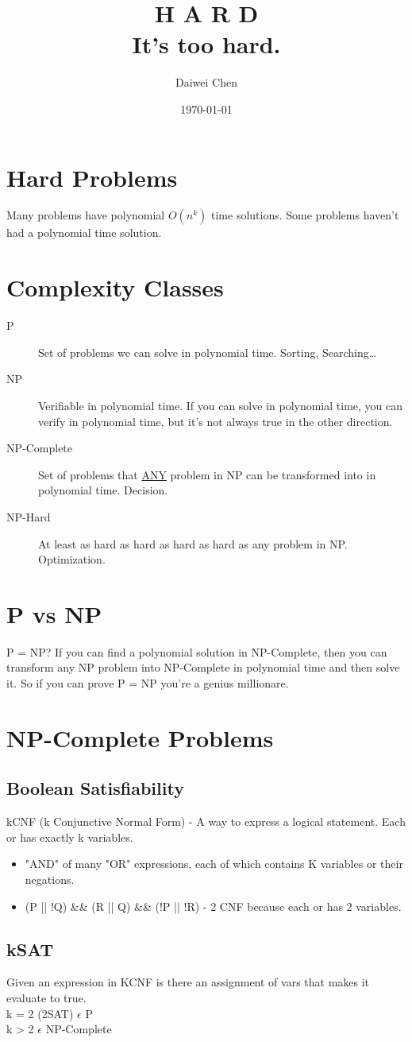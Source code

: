 \documentclass{article}
\author{Daiwei Chen}
\date{\today}
\title{\textbf{H A R D}\\\medskip
\large It's too hard.}
\begin{document}
\maketitle
\tableofcontents


\section{Hard Problems}
\label{sec:orgbdc091a}
Many problems have polynomial \(O(n^k)\) time solutions.
Some problems haven't had a polynomial time solution.

\section{Complexity Classes}
\label{sec:org485cc46}
\begin{description}
\item[{P}] Set of problems we can solve in polynomial time. Sorting, Searching\ldots{}
\item[{NP}] Verifiable in polynomial time. If you can solve in polynomial time, you can verify in polynomial time, but it's not always true in the other direction.
\item[{NP-Complete}] Set of problems that \uline{ANY} problem in NP can be transformed into in polynomial time. Decision.
\item[{NP-Hard}] At least as hard as hard as hard as hard as any problem in NP. Optimization.
\end{description}

\section{P vs NP}
\label{sec:org9202355}
P = NP? If you can find a polynomial solution in NP-Complete, then you can transform any NP problem into NP-Complete in polynomial time and then solve it. So if you can prove P = NP you're a genius millionare.

\section{NP-Complete Problems}
\label{sec:org52b0db7}
\subsection{Boolean Satisfiability}
\label{sec:org012e579}
kCNF (k Conjunctive Normal Form) - A way to express a logical statement. Each or has exactly k variables.
\begin{itemize}
\item "AND" of many "OR" expressions, each of which contains K variables or their negations.
\item (P || !Q) \&\& (R || Q) \&\& (!P || !R) - 2 CNF because each or has 2 variables.
\end{itemize}
\subsection{kSAT}
\label{sec:org2abd563}
Given an expression in KCNF is there an assignment of vars that makes it evaluate to true. \\
k = 2 (2SAT) \(\epsilon\) P \\
k > 2 \(\epsilon\) NP-Complete
\end{document}
